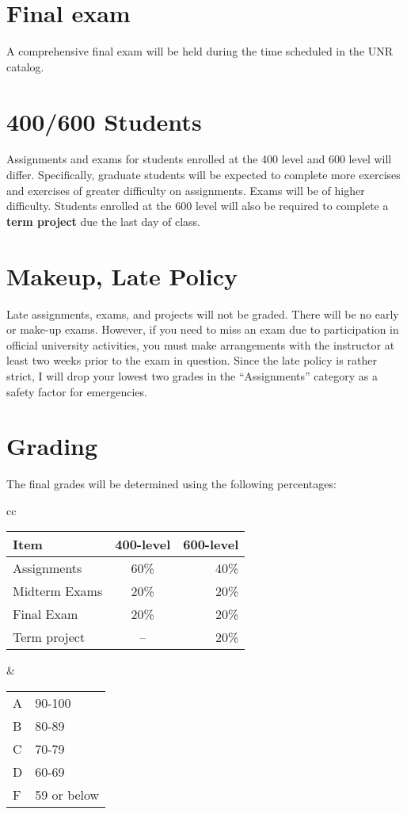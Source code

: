 \documentclass[11pt,onecolumn]{article}
\begin{document}
\section*{Final exam}
A comprehensive final exam will be held during the time scheduled in the UNR catalog.

\section*{400/600 Students}
Assignments and exams for students enrolled at the 400 level and 600 level will differ. Specifically, graduate students will be expected to complete more exercises and exercises of greater difficulty on assignments. Exams will be of higher difficulty. Students enrolled at the 600 level will also be required to complete a \textbf{term project} due the last day of class.

\section*{Makeup, Late Policy}
Late assignments, exams, and projects will not be graded. There will be no early or make-up exams. However, if you need to miss an exam due to participation in official university activities, you must make arrangements with the instructor at least two weeks prior to the exam in question. Since the late policy is rather strict, I will drop your lowest two grades in the ``Assignments'' category as a safety factor for emergencies.

\section*{Grading}
The final grades will be determined using the following percentages:

\begin{center}
\begin{tabular}{cc}
\begin{tabular}{l|c|r}	%
Item&400-level& 600-level\\\hline\hline
  Assignments&60\% & 40\%\\
  Midterm Exams&20\%& 20\%\\
  Final Exam&20\%& 20\%\\
  Term project &-- &20\%\\
\end{tabular}
&
\begin{tabular}{ll}
A&90-100\\
B&80-89\\
C&70-79\\
D&60-69\\
F&59 or below
\end{tabular}
\end{tabular}
\end{center}
\end{document}
